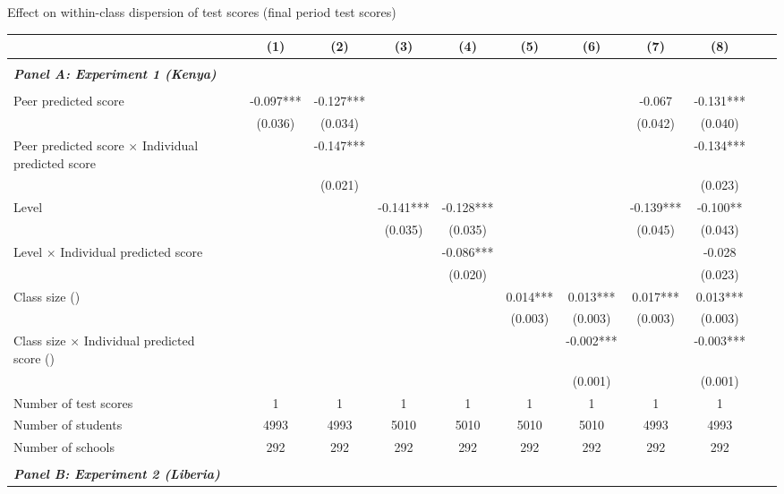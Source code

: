 \begin{center} 
\caption{\small Effect on within-class dispersion of test scores (final period test scores)} 
\label{tab:descriptives} 
\begin{scriptsize}
\begin{threeparttable}
\begin{tabular} {@{} l l c c c c c c c c c c  @{}} \toprule \toprule
& &(1)&(2)&(3)&(4)&(5)&(6)&(7)&(8) \\ \midrule 
\\
\multicolumn{3}{l}{\textbf{\textit{Panel A: Experiment 1 (Kenya)}}} \\
\\
Peer predicted score &  & -0.097*** & -0.127*** &  &  &  &  & -0.067 & -0.131*** \\
                 &  & (0.036) & (0.034) &  &  &  &  & (0.042) & (0.040) \\
Peer predicted score $\times$ Individual predicted score &  &  & -0.147*** &  &  &  &  &  & -0.134*** \\
                 &  &  & (0.021) &  &  &  &  &  & (0.023) \\
Level &  &  &  & -0.141*** & -0.128*** &  &  & -0.139*** & -0.100** \\
                 &  &  &  & (0.035) & (0.035) &  &  & (0.045) & (0.043) \\
Level $\times$ Individual predicted score &  &  &  &  & -0.086*** &  &  &  & -0.028 \\
                 &  &  &  &  & (0.020) &  &  &  & (0.023) \\
Class size (\times 10) &  &  &  &  &  & 0.014*** & 0.013*** & 0.017*** & 0.013*** \\
                 &  &  &  &  &  & (0.003) & (0.003) & (0.003) & (0.003) \\
Class size $\times$ Individual predicted score (\times 10) &  &  &  &  &  &  & -0.002*** &  & -0.003*** \\
                 &  &  &  &  &  &  & (0.001) &  & (0.001) \\
\midrule
Number of test scores &  & 1 & 1 & 1 & 1 & 1 & 1 & 1 & 1 \\
Number of students &  & 4993 & 4993 & 5010 & 5010 & 5010 & 5010 & 4993 & 4993 \\
Number of schools &  & 292 & 292 & 292 & 292 & 292 & 292 & 292 & 292 \\
 \midrule
\\
\multicolumn{3}{l}{\textbf{\textit{Panel B: Experiment 2 (Liberia)}}} \\

\end{tabular}
\end{threeparttable}
\end{scriptsize}
\end{center}
